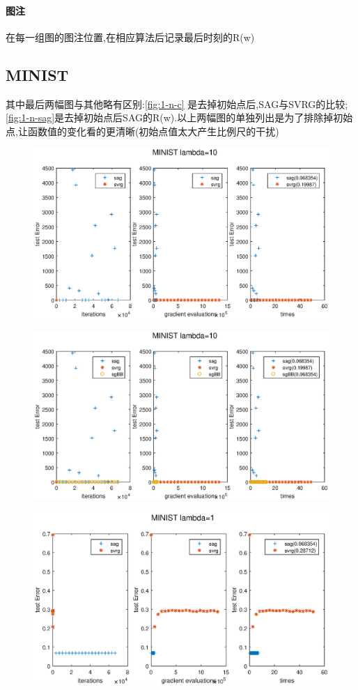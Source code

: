 \documentclass[UTF8]{ctexart}
\begin{document}
\paragraph{图注}
在每一组图的图注位置,在相应算法后记录最后时刻的R(w)

\subsection{MINIST}
其中最后两幅图与其他略有区别:\ref{fig:1-n-c} 是去掉初始点后,SAG与SVRG的比较;\ref{fig:1-n-sag}是去掉初始点后SAG的R(w).以上两幅图的单独列出是为了排除掉初始点,让函数值的变化看的更清晰(初始点值太大产生比例尺的干扰)
\begin{figure}[htbp]
\centering\includegraphics[width=5in]{1-10-a.eps}
\label{fig:1-10-a}
\end{figure}
\begin{figure}[htbp]
\centering\includegraphics[width=5in]{1-10-b.eps}
\label{fig:1-10-b}
\end{figure}

\begin{figure}[htbp]
\centering\includegraphics[width=5in]{1-1-a.eps}
\label{fig:1-1-a}
\end{figure}
\end{document}

